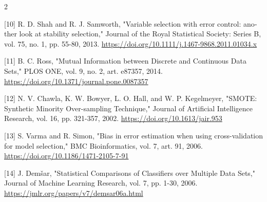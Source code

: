 \documentclass[10pt,a4paper]{article}
\begin{document}
\begin{multicols}{2}
\begin{minipage}{\linewidth}{\fontsize{7}{8.2}\selectfont \begin{latin}[10] R. D. Shah and R. J. Samworth, "Variable selection with error control: another look at stability selection," Journal of the Royal Statistical Society: Series B, vol. 75, no. 1, pp. 55-80, 2013. \url{https://doi.org/10.1111/j.1467-9868.2011.01034.x}\end{latin}\par}\end{minipage}\par
\begin{minipage}{\linewidth}{\fontsize{7}{8.2}\selectfont \begin{latin}[11] B. C. Ross, "Mutual Information between Discrete and Continuous Data Sets," PLOS ONE, vol. 9, no. 2, art. e87357, 2014. \url{https://doi.org/10.1371/journal.pone.0087357}\end{latin}\par}\end{minipage}\par
\begin{minipage}{\linewidth}{\fontsize{7}{8.2}\selectfont \begin{latin}[12] N. V. Chawla, K. W. Bowyer, L. O. Hall, and W. P. Kegelmeyer, "SMOTE: Synthetic Minority Over-sampling Technique," Journal of Artificial Intelligence Research, vol. 16, pp. 321-357, 2002. \url{https://doi.org/10.1613/jair.953}\end{latin}\par}\end{minipage}\par
\begin{minipage}{\linewidth}{\fontsize{7}{8.2}\selectfont \begin{latin}[13] S. Varma and R. Simon, "Bias in error estimation when using cross-validation for model selection," BMC Bioinformatics, vol. 7, art. 91, 2006. \url{https://doi.org/10.1186/1471-2105-7-91}\end{latin}\par}\end{minipage}\par
\begin{minipage}{\linewidth}{\fontsize{7}{8.2}\selectfont \begin{latin}[14] J. Demšar, "Statistical Comparisons of Classifiers over Multiple Data Sets," Journal of Machine Learning Research, vol. 7, pp. 1-30, 2006. \url{https://jmlr.org/papers/v7/demsar06a.html}\end{latin}\par}\end{minipage}\par

\end{multicols}
\end{document}
